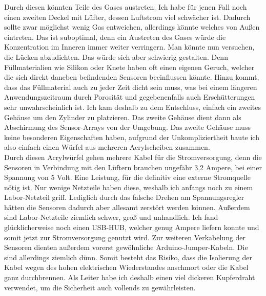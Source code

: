 \documentclass[10pt]{article}
\begin{document}
Durch diesen könnten Teile des Gases austreten. Ich habe für jenen Fall noch einen zweiten Deckel mit Lüfter, dessen
Luftstrom viel schwächer ist. Dadurch sollte zwar möglichst wenig Gas entweichen, allerdings könnte welches von Außen 
eintreten. Das ist suboptimal, denn ein Austreten des Gases würde die Konzentration im Inneren immer weiter verringern. Man könnte
nun versuchen, die Lücken abzudichten. Das würde sich aber schwierig gestalten. Denn Füllmaterialien wie Silikon oder Knete
haben oft einen eigenen Geruch, welcher die sich direkt daneben befindenden Sensoren beeinflussen könnte. Hinzu kommt, dass das Füllmaterial 
auch zu jeder Zeit dicht sein muss, was bei einem längeren Anwendungszeitraum durch Porosität und gegebenenfalls auch Erschütterungen sehr unwahrscheinlich ist. 
Ich kam deshalb zu dem Entschluss, einfach ein zweites Gehäuse um den Zylinder zu platzieren. Das zweite Gehäuse dient dann
als Abschirmung des Sensor-Arrays von der Umgebung. Das zweite Gehäuse muss keine besonderen Eigenschaften haben, 
aufgrund der Unkompliziertheit baute ich also einfach einen Würfel aus mehreren Acrylscheiben zusammen.\\
Durch diesen Acrylwürfel gehen mehrere Kabel für die Stromversorgung, denn die Sensoren in Verbindung mit den Lüftern brauchen ungefähr 3,2 Ampere, bei einer Spannung
von 5 Volt. Eine Leistung, für die definitiv eine externe Stromquelle nötig ist. Nur wenige Netzteile haben diese, weshalb ich anfangs noch zu einem Labor-Netzteil griff. 
Lediglich durch das falsche Drehen am Spannungsregler
hätten die Sensoren dadurch aber allesamt zerstört werden können. Außerdem sind Labor-Netzteile ziemlich schwer, groß und unhandlich. Ich fand glücklicherweise noch einen USB-HUB, welcher 
genug Ampere liefern konnte und somit jetzt zur Stromversorgung genutzt wird.
Zur weiteren Verkabelung der Sensoren dienten außerdem vorerst gewöhnliche Arduino-Jumper-Kabeln. Die sind allerdings
ziemlich dünn. Somit besteht das Risiko, dass die Isolierung der Kabel wegen des hohen elektrischen Wiederstandes anschmort oder die Kabel ganz durchbrennen. 
Als Leiter habe ich deshalb einen viel dickeren Kupferdraht verwendet, um die Sicherheit auch vollends zu gewährleisten.
\end{document}
